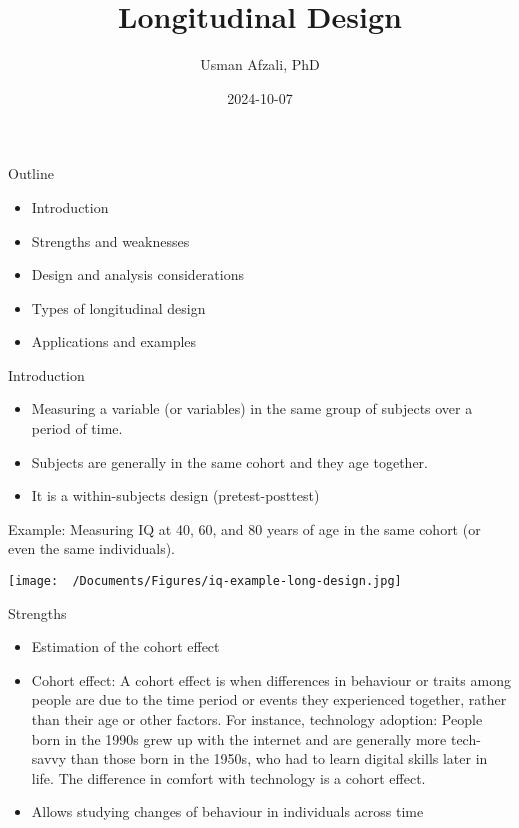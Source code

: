 \documentclass[
  ignorenonframetext,
  aspectratio=169,
]{beamer}
\title{Longitudinal Design}
\author{Usman Afzali, PhD}
\date{2024-10-07}
\providecommand{\tightlist}{%
  \setlength{\itemsep}{0pt}\setlength{\parskip}{0pt}}\usepackage{longtable,booktabs,array}
\begin{document}
\frame{\titlepage}

\begin{frame}{Outline}
\label{outline}
\begin{itemize}
\tightlist
\item
  Introduction
\item
  Strengths and weaknesses
\item
  Design and analysis considerations
\item
  Types of longitudinal design
\item
  Applications and examples
\end{itemize}
\end{frame}

\begin{frame}{Introduction}
\label{introduction}
\begin{itemize}[<+->]
\tightlist
\item
  Measuring a variable (or variables) in the same group of subjects over
  a period of time.
\item
  Subjects are generally in the same cohort and they age together.
\item
  It is a within-subjects design (pretest-posttest)
\end{itemize}
\end{frame}

\begin{frame}
Example: Measuring IQ at 40, 60, and 80 years of age in the same cohort
(or even the same individuals).

\begin{center}
\texttt{[image: ~/Documents/Figures/iq-example-long-design.jpg]}
\end{center}
\end{frame}

\begin{frame}{Strengths}
\label{strengths}
\begin{itemize}[<+->]
\tightlist
\item
  Estimation of the cohort effect
\item
  Cohort effect: A cohort effect is when differences in behaviour or
  traits among people are due to the time period or events they
  experienced together, rather than their age or other factors. For
  instance, technology adoption: People born in the 1990s grew up with
  the internet and are generally more tech-savvy than those born in the
  1950s, who had to learn digital skills later in life. The difference
  in comfort with technology is a cohort effect.
\item
  Allows studying changes of behaviour in individuals across time
\end{itemize}
\end{frame}
\end{document}
